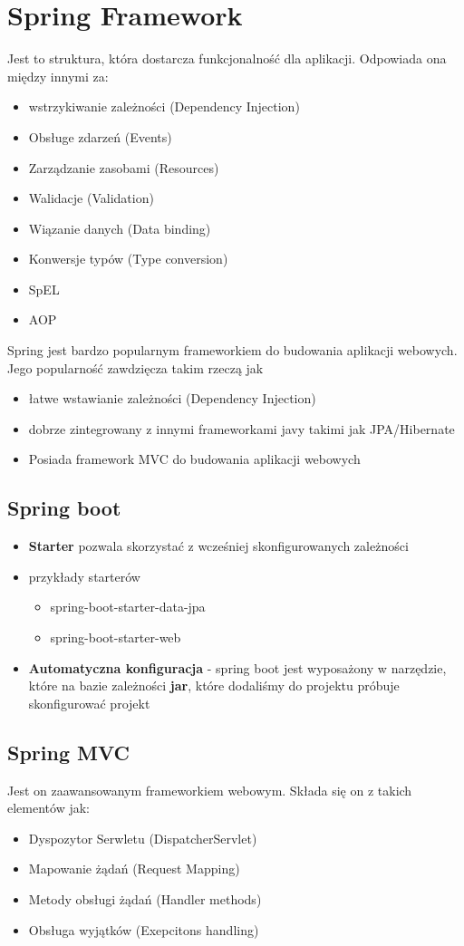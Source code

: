 \section{Spring Framework \cite{HK}}
Jest to struktura, która dostarcza funkcjonalność dla aplikacji. Odpowiada ona między innymi za: 
\begin{itemize}
    \item wstrzykiwanie zależności (Dependency Injection)
    \item Obsługe zdarzeń (Events)
    \item Zarządzanie zasobami (Resources)
    \item Walidacje (Validation)
    \item Wiązanie danych (Data binding)
    \item Konwersje typów (Type conversion)
    \item SpEL
    \item AOP
\end{itemize}
Spring jest bardzo popularnym frameworkiem do budowania aplikacji webowych.
\\Jego popularność zawdzięcza takim rzeczą jak
\begin{itemize}
    \item łatwe wstawianie zależności (Dependency Injection)
    \item dobrze zintegrowany z innymi frameworkami javy takimi jak JPA/Hibernate
    \item Posiada framework MVC do budowania aplikacji webowych
\end{itemize}
\subsection{Spring boot}
\begin{itemize}
    \item \textbf{Starter} pozwala skorzystać z wcześniej skonfigurowanych zależności 
    \item przykłady starterów
    \begin{itemize}
        \item spring-boot-starter-data-jpa
        \item spring-boot-starter-web
    \end{itemize}
    \item \textbf{Automatyczna konfiguracja} - spring boot jest wyposażony w narzędzie, które na bazie zależności \textbf{jar}, które dodaliśmy do projektu  próbuje skonfigurować projekt
\end{itemize}

\subsection{Spring MVC}
Jest on zaawansowanym frameworkiem webowym. Składa się on z takich elementów jak:
\begin{itemize}
    \item Dyspozytor Serwletu (DispatcherServlet)
    \item Mapowanie żądań (Request Mapping)
    \item Metody obsługi żądań (Handler methods)
    \item Obsługa wyjątków (Exepcitons handling)
\end{itemize}